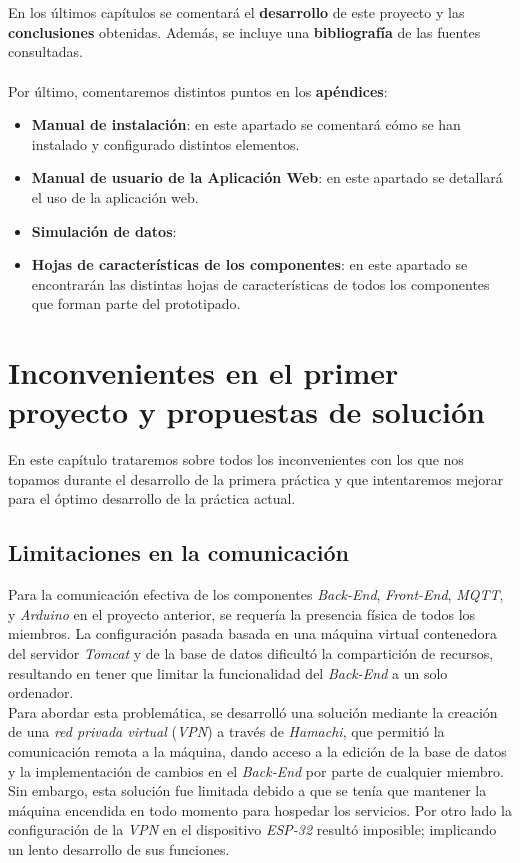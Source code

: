 \documentclass[12pt]{report}
\begin{document}
\\\\
En los últimos capítulos se comentará el \textbf{desarrollo} de este proyecto y las \textbf{conclusiones} obtenidas. Además, se incluye una \textbf{bibliografía} de las fuentes consultadas.
\\\\
Por último, comentaremos distintos puntos en los \textbf{apéndices}:
\begin{itemize}
    \item \textbf{Manual de instalación}: en este apartado se comentará cómo se han instalado y configurado distintos elementos.
    \item \textbf{Manual de usuario de la Aplicación Web}: en este apartado se detallará el uso de la aplicación web.
    \item \textbf{Simulación de datos}: %
    \item \textbf{Hojas de características de los componentes}: en este apartado se encontrarán las distintas hojas de características de todos los componentes que forman parte del prototipado.
\end{itemize}

\chapter{Inconvenientes en el primer proyecto y propuestas de solución}
En este capítulo trataremos sobre todos los inconvenientes con los que nos topamos durante el desarrollo de la primera práctica y que intentaremos mejorar para el óptimo desarrollo de la práctica actual.
\section{Limitaciones en la comunicación}
Para la comunicación efectiva de los componentes \textit{Back-End}, \textit{Front-End}, \textit{MQTT}, y \textit{Arduino} en el proyecto anterior, se requería la presencia física de todos los miembros. La configuración pasada basada en una máquina virtual contenedora del servidor \textit{Tomcat} y de la base de datos dificultó la compartición de recursos, resultando en tener que limitar la funcionalidad del \textit{Back-End} a un solo ordenador.\\
Para abordar esta problemática, se desarrolló una solución mediante la creación de una \textit{red privada virtual} (\textit{VPN}) a través de \textit{Hamachi}, que permitió la comunicación remota a la máquina, dando acceso a la edición de la base de datos y la implementación de cambios en el \textit{Back-End} por parte de cualquier miembro. Sin embargo, esta solución fue limitada debido a que se tenía que mantener la máquina encendida en todo momento para hospedar los servicios. Por otro lado la configuración de la \textit{VPN} en el dispositivo \textit{ESP-32} resultó imposible; implicando un lento desarrollo de sus funciones.
\end{document}
